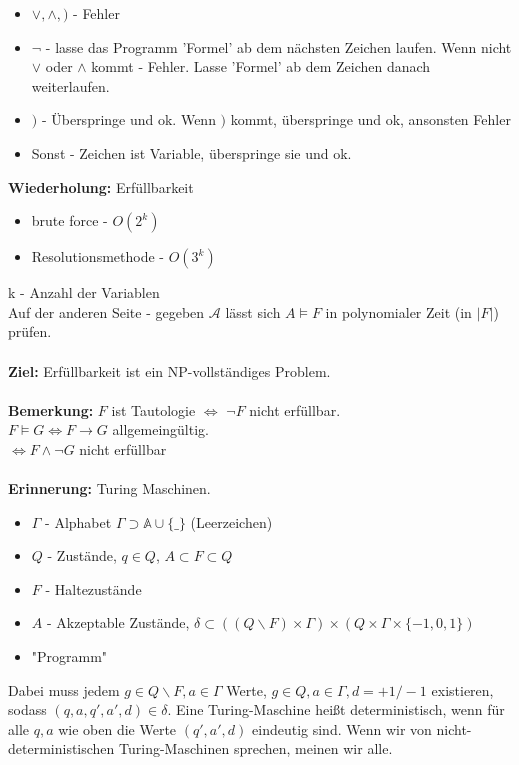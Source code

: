 \documentclass[a4paper]{scrartcl}
\begin{document}
\begin{itemize}
\item $\vee, \wedge, )$ - Fehler
\item $\neg$ - lasse das Programm 'Formel' ab dem nächsten Zeichen laufen. Wenn nicht $\vee$ oder $\wedge$ kommt - Fehler. Lasse 'Formel' ab dem Zeichen danach weiterlaufen.
\item $)$ - Überspringe und ok. Wenn $)$ kommt, überspringe und ok, ansonsten Fehler
\item Sonst - Zeichen ist Variable, überspringe sie und ok.
\end{itemize}
\textbf{Wiederholung:} Erfüllbarkeit
\begin{itemize}
\item brute force - $O(2^k)$
\item Resolutionsmethode - $O(3^k)$
\end{itemize}
k - Anzahl der Variablen \\
Auf der anderen Seite - gegeben $\mathcal{A}$ lässt sich $A \models F$ in polynomialer Zeit (in $|F|$) prüfen.\bigskip\\\\
\textbf{Ziel:} Erfüllbarkeit ist ein NP-vollständiges Problem.
\bigskip\\\\
\textbf{Bemerkung:} $F$  ist Tautologie $\Leftrightarrow$ $\neg F$ nicht erfüllbar.\\
$F \models G \Leftrightarrow F \rightarrow G$ allgemeingültig.\\
$\Leftrightarrow F \wedge \neg G$ nicht erfüllbar
\bigskip\\\\
\textbf{Erinnerung:} Turing Maschinen.
\begin{itemize}
\item $\Gamma$ - Alphabet $\Gamma \supset \mathbb{A} \cup \{\_\}$ (Leerzeichen)
\item $Q$ - Zustände, $q \in Q$, $A \subset F \subset Q$
\item $F$ - Haltezustände
\item $A$ - Akzeptable Zustände, $\delta \subset ((Q \backslash F) \times \Gamma) \times (Q \times \Gamma \times \{-1, 0, 1\})$
\item "Programm"
\end{itemize}
Dabei muss jedem $g \in Q \backslash F, a \in \Gamma$ Werte, $g \in Q, a \in \Gamma, d = +1 / -1$ existieren, sodass $(q,a, q', a', d) \in \delta$. Eine Turing-Maschine heißt deterministisch, wenn für alle $q, a$ wie oben die Werte $(q', a', d)$ eindeutig sind. Wenn wir von nicht-deterministischen Turing-Maschinen sprechen, meinen wir alle.\\
\end{document}
